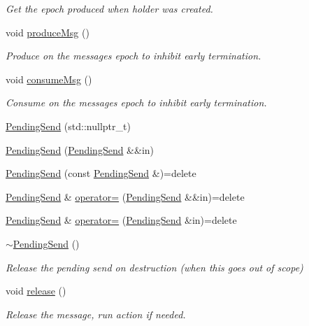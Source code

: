 \begin{DoxyCompactItemize}
\begin{DoxyCompactList}\small\item\em Get the epoch produced when holder was created. \end{DoxyCompactList}\item 
void \hyperlink{structvt_1_1messaging_1_1_pending_send_af5961bb21b4a427732be91ac699d570b}{produce\+Msg} ()
\begin{DoxyCompactList}\small\item\em Produce on the messages epoch to inhibit early termination. \end{DoxyCompactList}\item 
void \hyperlink{structvt_1_1messaging_1_1_pending_send_a0f249a127a798ba0823fae82c925ed3b}{consume\+Msg} ()
\begin{DoxyCompactList}\small\item\em Consume on the messages epoch to inhibit early termination. \end{DoxyCompactList}\item 
\hyperlink{structvt_1_1messaging_1_1_pending_send_a129a9c509eacf26111013105affe5931}{Pending\+Send} (std\+::nullptr\+\_\+t)
\item 
\hyperlink{structvt_1_1messaging_1_1_pending_send_a20551a473781d22c7ccfb6664d88e0ef}{Pending\+Send} (\hyperlink{structvt_1_1messaging_1_1_pending_send}{Pending\+Send} \&\&in)
\item 
\hyperlink{structvt_1_1messaging_1_1_pending_send_a951912c336cf3cdaf91f8ccde13092af}{Pending\+Send} (const \hyperlink{structvt_1_1messaging_1_1_pending_send}{Pending\+Send} \&)=delete
\item 
\hyperlink{structvt_1_1messaging_1_1_pending_send}{Pending\+Send} \& \hyperlink{structvt_1_1messaging_1_1_pending_send_aecef2d10d22564d142b9de52a57d81c8}{operator=} (\hyperlink{structvt_1_1messaging_1_1_pending_send}{Pending\+Send} \&\&in)=delete
\item 
\hyperlink{structvt_1_1messaging_1_1_pending_send}{Pending\+Send} \& \hyperlink{structvt_1_1messaging_1_1_pending_send_addfa1d51e3b8f272b5e711867e893bca}{operator=} (\hyperlink{structvt_1_1messaging_1_1_pending_send}{Pending\+Send} \&in)=delete
\item 
\hyperlink{structvt_1_1messaging_1_1_pending_send_ade803ff2903a92eaf62b6e330593871b}{$\sim$\+Pending\+Send} ()
\begin{DoxyCompactList}\small\item\em Release the pending send on destruction (when this goes out of scope) \end{DoxyCompactList}\item 
void \hyperlink{structvt_1_1messaging_1_1_pending_send_ad4b41412f953dcd22b3e3020a812f757}{release} ()
\begin{DoxyCompactList}\small\item\em Release the message, run action if needed. \end{DoxyCompactList}\end{DoxyCompactItemize}
